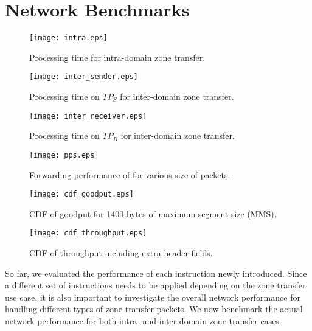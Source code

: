 \section{Network Benchmarks}
\label{sec:networkbenchmark}

\begin{figure}[htb]
	\begin{minipage}{.47\linewidth}
		\centering
		\texttt{[image: intra.eps]}
		\caption{Processing time for intra-domain zone transfer.}
		\label{fig:intra}
	\end{minipage}\hspace{1em}
	\begin{minipage}{.47\linewidth}
		\centering
		\texttt{[image: inter\_sender.eps]}
		\caption{Processing time on $TP_S$ for inter-domain zone transfer.}
		\label{fig:inter_sender}
	\end{minipage}\vspace{2em}
	\begin{minipage}{.47\linewidth}
		\centering
		\texttt{[image: inter\_receiver.eps]}
		\caption{Processing time on $TP_R$ for inter-domain zone transfer.}
		\label{fig:inter_receiver}
	\end{minipage}\hspace{1em}
	\begin{minipage}{.47\linewidth}
		\centering
		\texttt{[image: pps.eps]}
		\caption{Forwarding performance of \tp for various size of packets.}
		\label{fig:forwarding}
	\end{minipage}\vspace{2em}
	\begin{minipage}{.47\linewidth}
		\centering
		\texttt{[image: cdf\_goodput.eps]}
		\caption{CDF of goodput for 1400-bytes of maximum segment size (MMS).}
		\label{fig:goodput}
	\end{minipage}\hspace{1em}
	\begin{minipage}{.47\linewidth}
		\centering
		\texttt{[image: cdf\_throughput.eps]}
		\caption{CDF of throughput including extra header fields.}
		\label{fig:throughput}
	\end{minipage}
\end{figure}

So far, we evaluated the performance of each instruction newly introduced. Since a different
set of instructions needs to be applied depending on the zone transfer use case, it is also
important to investigate the overall network performance for handling different types of zone
transfer packets. We now benchmark the actual network performance for both intra- and inter-domain
zone transfer cases.

